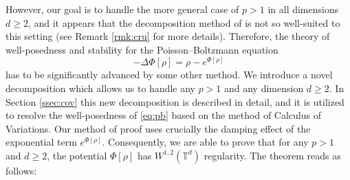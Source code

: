 \documentclass[11pt,reqno,a4paper]{amsart}
\theoremstyle{definition}
\theoremstyle{remark}
\numberwithin{equation}{section}
\newcommand{\T} {\mathbb T}
\newcommand{\bq}{\begin{equation}}
\newcommand{\eq}{\end{equation}}
\begin{document}
However, our goal is to handle the more general case of $p>1$ in all dimensions $d\ge2$, and it appears that the decomposition method of \cite{hankwaniacobelli2017a} is not so well-suited to this setting (see Remark \ref{rmk:cru} for more details). Therefore, the theory of well-posedness and stability for the Poisson--Boltzmann equation
\bq\label{eq:pb}
-\Delta \Phi[\rho] = \rho - e^{\Phi[\rho]} 
\eq
has to be significantly advanced by some other method. We introduce a novel decomposition which allows us to handle any $p>1$ and any dimension $d\ge 2$. In Section \ref{ssec:cov} this new decomposition is described in detail, and it is utilized to resolve the well-posedness of \eqref{eq:pb} based on the method of Calculus of Variations. Our method of proof uses crucially the damping effect of the exponential term $e^{\Phi[\rho]}$. Consequently, we are able to prove that for any $p>1$ and $d\ge 2$, the potential $\Phi[\rho]$ has $W^{1,2}(\T^d)$ regularity. %
The theorem reads as follows: 



\end{document}
